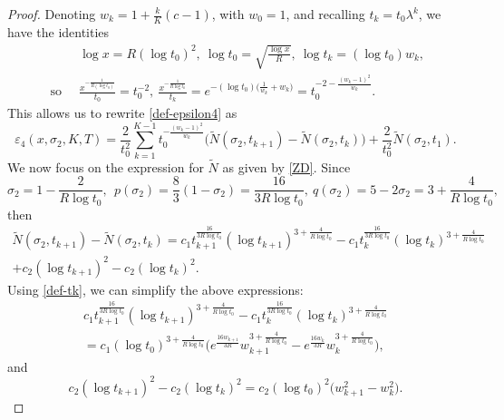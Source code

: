 \documentclass[10pt]{amsart}
\newcommand{\s}{\sigma}
\theoremstyle{definition}
\numberwithin{equation}{section}
\begin{document}
\begin{proof}
Denoting $w_k = 1 + \frac{k}{K}(c-1)$, with $w_0=1$, and recalling $t_k = t_0\lambda^k$, we have the identities 
\begin{equation}\label{def-tk}
\begin{split}
& \log x = R(\log t_0)^2, \ 
\log t_0 = \sqrt{\frac{\log x}{R}}, \ 
\log t_k  %
= (\log t_0) w_k, \\ 
\text{ so }\ 
& \frac{x^{-\frac{1}{R(\log t_{0})}} }{t_0} = t_0^{-2}, \ %
\frac{x^{-\frac{1}{R\log t_{k} }} }{t_k} 
=  e^{-(\log t_0) \big(\frac{1}{w_k} + w_k\big)} 
= t_0^{-2 - \frac{(w_k-1)^2}{w_k} } .
\end{split}
\end{equation}
%
This allows us to rewrite \eqref{def-epsilon4} as
\begin{equation}\label{eps4-1}
\varepsilon_4(x,\s_2,K,T) =\frac{2}{t_0^2}\sum_{k=1}^{K-1} t_0^{ - \frac{(w_k-1)^2}{w_k} } 
\Big(  \tilde{N}(\s_2, t_{k+1}) - \tilde{N}(\s_2, t_{k}) \Big)  
+\frac{2}{t_0^2} \tilde{N}(\s_2, t_{1}).
\end{equation}
We now focus on the expression for $\tilde N$ as given by \eqref{ZD}.
Since
\[
\sigma_2 = 1-\frac{2}{R\log t_0} ,\
\ p(\s_2) = \frac{8}{3}(1-\s_2) = \frac{16}{3 R\log t_0}, 
\  q(\s_2) = 5-2\s_2= 3+\frac{4}{R\log t_0},
\]
then
\begin{multline}\label{diffN}   
\tilde{N}(\s_2, t_{k+1}) - \tilde{N}(\s_2, t_{k}) 
= 
c_1  t_{k+1}^{\frac{16}{3 R\log t_0}} (\log  t_{k+1} )^{3+\frac{4}{R\log t_0}} - c_1  t_{k}^{\frac{16}{3 R\log t_0}} (\log  t_{k} )^{3+\frac{4}{R\log t_0}}
\\ + c_2  (\log  t_{k+1})^2 - c_2  (\log  t_{k})^2 .
\end{multline}
Using \eqref{def-tk}, we can simplify the above expressions: 
\begin{multline}
 c_1  t_{k+1}^{\frac{16}{3 R\log t_0}} (\log  t_{k+1} )^{3+\frac{4}{R\log t_0}} - c_1  t_{k}^{\frac{16}{3 R\log t_0}} (\log  t_{k} )^{3+\frac{4}{R\log t_0}}
\\= c_1 (\log t_0)^{3+\frac{4}{R\log t_0}}  \Big( e^{\frac{16w_{k+1}}{3 R} } w_{k+1}^{3+\frac{4}{R\log t_0}} -  e^{\frac{16w_k}{3 R } }  w_k ^{3+\frac{4}{R\log t_0}}\Big) ,
\end{multline}
and
\begin{equation}
c_2  (\log  t_{k+1})^2 - c_2  (\log  t_{k})^2 
=  c_2  (\log  t_0)^2 \big(w_{k+1}^2 - w_{k}^2\big) .
\end{equation}

\end{proof}
\end{document}
